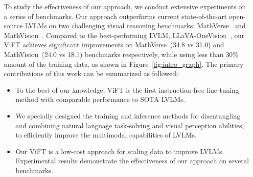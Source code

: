 To study the effectiveness of our approach, we conduct extensive experiments on a series of benchmarks. %
Our approach outperforms current state-of-the-art open-source LVLMs on two challenging visual reasoning benchmarks: MathVerse~\cite{zhang2025mathverse} and MathVision~\cite{wang2024measuring}. 
Compared to the best-performing LVLM, LLaVA-OneVision~\cite{li2024llava}, our ViFT achieves significant improvements on MathVerse~(34.8 vs 31.0) and MathVision~(24.0 vs 18.1) benchmarks respectively, while using less than 30\% amount of the training data, as shown in Figure~\ref{fig:intro_graph}.
The primary contributions of this work can be summarized as followed:

\begin{itemize}
    \item To the best of our knowledge, ViFT is the first instruction-free fine-tuning method with comparable performance to SOTA LVLMs.
    \item We specially designed the training and inference methods for disentangling and combining natural language task-solving and visual perception abilities, to efficiently improve the multimodal capabilities of LVLMs.
    \item Our ViFT is a low-cost approach for scaling data to improve LVLMs.
    Experimental results demonstrate the effectiveness of our approach on several benchmarks.
\end{itemize}

